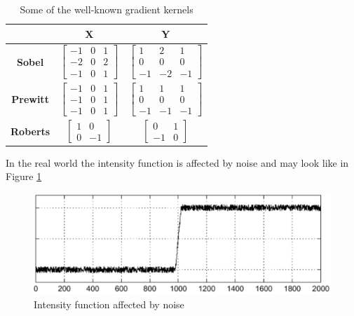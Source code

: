 {\renewcommand{\arraystretch}{2}
\begin{table}[H]
	\centering
	\begin{tabular}{|c|c|c|}
		\hline
		\cellcolor{gray} & \textbf{X} & \textbf{Y} \\
		\hline
		\textbf{Sobel} & $\begin{bmatrix} -1 & 0 & 1 \\ -2 & 0 & 2 \\ -1 & 0 & 1 \end{bmatrix}$ & $\begin{bmatrix} 1 & 2 & 1 \\ 0 & 0 & 0 \\ -1 & -2 & -1\end{bmatrix}$ \\
		\hline
		\textbf{Prewitt} & $\begin{bmatrix} -1 & 0 & 1 \\ -1 & 0 & 1 \\ -1 & 0 & 1 \end{bmatrix}$ & $\begin{bmatrix} 1 & 1 & 1 \\ 0 & 0 & 0 \\ -1 & -1 & -1 \end{bmatrix}$ \\
		\hline
		\textbf{Roberts} & $\begin{bmatrix} 1 & 0 \\ 0 & -1 \end{bmatrix}$ & $\begin{bmatrix} 0 & 1 \\ -1 & 0 \end{bmatrix}$ \\
		\hline
	\end{tabular}
	\caption{Some of the well-known gradient kernels}
\end{table}
}
In the real world the intensity function is affected by noise and may look like in Figure \ref{fig:noise_intensity_function}
\begin{figure}[H]
	\centering
	\includegraphics[width=\textwidth]{images/noise_intensity_function}
	\caption{Intensity function affected by noise}
	\label{fig:noise_intensity_function}
\end{figure}
